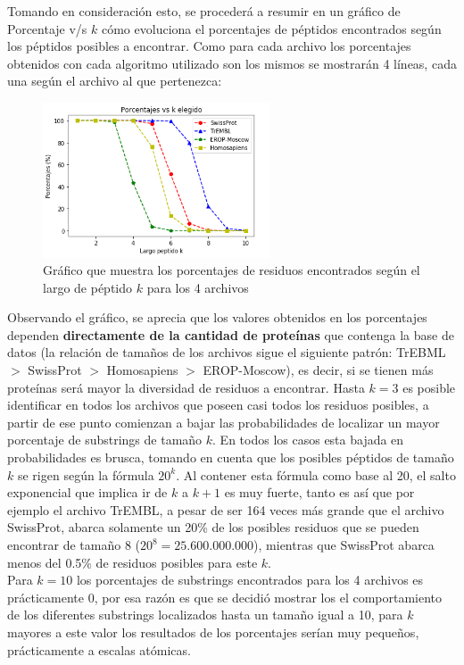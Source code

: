 Tomando en consideración esto, se procederá a resumir en un gráfico de Porcentaje v/s $k$ cómo evoluciona el porcentajes de péptidos encontrados según los péptidos posibles a encontrar. Como para cada archivo los porcentajes obtenidos con cada algoritmo utilizado son los mismos se mostrarán 4 líneas, cada una según el archivo al que pertenezca:

\newpage

\begin{figure}[h]
    \centering
    \includegraphics[width=0.6\textwidth]{./images/grafico1v1.png}
    \caption{Gráfico que muestra los porcentajes de residuos encontrados según el largo de péptido $k$ para los 4 archivos}
    \label{fig:imple2}
\end{figure}

Observando el gráfico, se aprecia que los valores obtenidos en los porcentajes dependen \textbf{directamente de la cantidad de proteínas} que contenga la base de datos (la relación de tamaños de los archivos sigue el siguiente patrón: TrEBML $>$ SwissProt $>$ Homosapiens $>$ EROP-Moscow), es decir, si se tienen más proteínas será mayor la diversidad de residuos a encontrar. Hasta $k=3$ es posible identificar en todos los archivos que poseen casi todos los residuos posibles, a partir de ese punto comienzan a bajar las probabilidades de localizar un mayor porcentaje de substrings de tamaño $k$. En todos los casos esta bajada en probabilidades es brusca, tomando en cuenta que los posibles péptidos de tamaño $k$ se rigen según la fórmula $20^{k}$. Al contener esta fórmula como base al 20, el salto exponencial que implica ir de $k$ a $k+1$ es muy fuerte, tanto es así que por ejemplo el archivo TrEMBL, a pesar de ser 164 veces más grande que el archivo SwissProt, abarca solamente un 20\% de los posibles residuos que se pueden encontrar de tamaño 8 ($20^{8} = 25.600.000.000$), mientras que SwissProt abarca menos del 0.5\% de residuos posibles para este $k$.\\
Para $k=10$ los porcentajes de substrings encontrados para los 4 archivos es prácticamente 0, por esa razón es que se decidió mostrar los el comportamiento de los diferentes substrings localizados hasta un tamaño igual a 10, para $k$ mayores a este valor los resultados de los porcentajes serían muy pequeños, prácticamente a escalas atómicas. 


